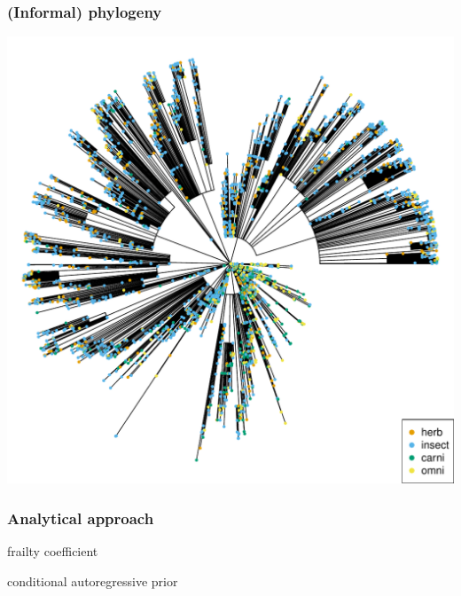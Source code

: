 \documentclass{beamer}
\begin{document}
\begin{frame}
  \frametitle{(Informal) phylogeny}
  \begin{center}
    \includegraphics[height = 0.8\textheight, width = \textwidth,  keepaspectratio = true]{figure/na_phylo_diet}
  \end{center}
\end{frame}

\begin{frame}
  \frametitle{Analytical approach}

  frailty coefficient 

  conditional autoregressive prior
\end{frame}
\end{document}
